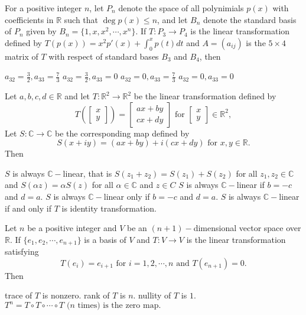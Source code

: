 \documentclass[10pt]{exam}
\newcommand{\R}{\ensuremath{\mathbb{R}}}
\newcommand{\C}{\ensuremath{\mathbb{C}}}
\begin{document}
\begin{questions}
\question
For a positive integer $n$, let $P_n$ denote the space of all polynimials $p(x)$ with coefficients in $\R$ such that $\deg p(x) \leq
n$, and let $B_n$ denote the standard basis of $P_n$ given by $B_n=\{1,x,x^2,\cdots , x^n\}$. If $T:P_3 \rightarrow P_4$ is the
linear transformation defined by $T(p(x))=x^2p'(x)+\int_0^x p(t)dt$ and $A=(a_{ij})$ is the $5\times 4$ matrix of $T$ with respect of
standard bases $B_3$ and $B_4$, then

\begin{oneparchoices}
\choice $a_{32}=\frac{3}{2},a_{33}=\frac{7}{3}$
\choice $a_{32}=\frac{3}{2},a_{33}=0$
\choice $a_{32}=0,a_{33}=\frac{7}{3}$
\choice $a_{32}=0,a_{33}=0$
\end{oneparchoices}

\question
Let $a,b,c,d \in \mathbb{R}$ and let $T:\R^2 \rightarrow \R^2$ be the linear transformation defined by 
$$T\left (\begin{bmatrix} x \\ y \end{bmatrix}\right) =\begin{bmatrix} ax+by \\ cx+dy \end{bmatrix} \text{ for } \begin{bmatrix} x \\ y \end{bmatrix}\in \mathbb{R}^2,$$
Let $S:\C \rightarrow \C$ be the corresponding map defined by 
$$S(x+iy)=(ax+by)+i(cx+dy) \text{ for } x,y\in \R.$$
Then

\begin{checkboxes}
\choice $S$ is always $\C-$linear, that is $S(z_1+z_2)=S(z_1)+S(z_2)$ for all $z_1,z_2 \in \C$ and $S(\alpha z)=\alpha S( z)$ for all $\alpha \in \C$ and $z \in C$
\choice $S$ is always $\C-$linear if $b=-c$ and $d=a$.
\choice $S$ is always $\C-$linear only if $b=-c$ and $d=a$.
\choice $S$ is always $\C-$linear if and only if $T$ is identity transformation.
\end{checkboxes}

\question 
Let $n$ be a positive integer and $V$ be an $(n+1)-$dimensional vector space over $\R$. If $\{e_1,e_2,\cdots,e_{n+1}\}$ is a basis of $V$ and $T:V\rightarrow V$ is the linear transformation satisfying 
$$T(e_i)=e_{i+1} \text{ for } i=1,2,\cdots, n \text{ and } T(e_{n+1})=0.$$
Then

\begin{checkboxes}
\choice trace of $T$ is nonzero.
\choice rank of $T$ is $n$.
\choice nullity of $T$ is $1$.
\choice $T^n=T\circ T \circ \cdots \circ T \text{ ($n$ times) is the zero map.} $
\end{checkboxes}


\end{questions}
\end{document}
